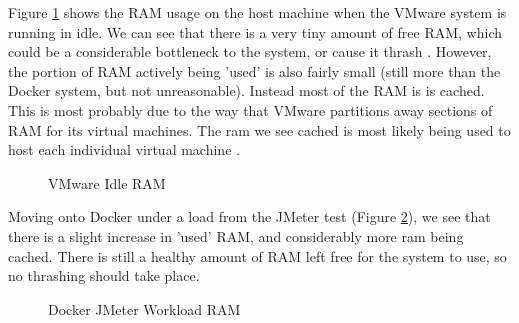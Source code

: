 Figure \ref{fig:VMwareRAMidle} shows the RAM usage on the host machine when the VMware system is running in idle. We can see that there is a very tiny amount of free RAM, which could be a considerable bottleneck to the system, or cause it thrash \citep{thrashing}. However, the portion of RAM actively being 'used' is also fairly small (still more than the Docker system, but not unreasonable). Instead most of the RAM is is cached. This is most probably due to the way that VMware partitions away sections of RAM for its virtual machines. The ram we see cached is most likely being used to host each individual virtual machine .

\begin{figure}[H]
\caption{VMware Idle RAM}
\label{fig:VMwareRAMidle}
\centering
\end{figure}

Moving onto Docker under a load from the JMeter test (Figure \ref{fig:DockerRAMwork}), we see that there is a slight increase in 'used' RAM, and considerably more ram being cached. There is still a healthy amount of RAM left free for the system to use, so no thrashing should take place.

\begin{figure}[H]
\caption{Docker JMeter Workload RAM}
\label{fig:DockerRAMwork}
\centering
\end{figure}

